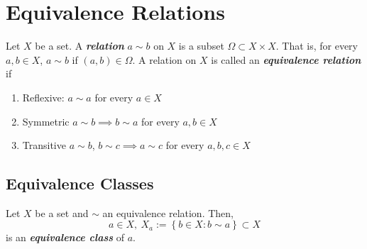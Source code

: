\documentclass{report}
\newcommand{\textib}[1]{\textit{\textbf{{#1}}}}
\begin{document}
\section{Equivalence Relations}
Let $X$ be a set. A \textib{relation} $a \sim b$ on $X$ is a subset $\Omega \subset X \times X$. That is,
for every $a, b \in X$, $a \sim b$ if $(a, b) \in \Omega$. A relation on $X$ is called an 
\textib{equivalence relation} if
\begin{enumerate}[label=\textit{(\roman*)}]
    \item Reflexive: $a \sim a$ for every $a \in X$
    \item Symmetric $a \sim b \implies b \sim a$ for every $a, b \in X$
    \item Transitive $a \sim b$, $b \sim c \implies a \sim c$ for every $a, b, c \in X$
\end{enumerate}


\subsection{Equivalence Classes}
Let $X$ be a set and $\sim$ an equivalence relation. Then,
\[a \in X, \ X_a := \left\{ b \in X : b \sim a \right\} \subset X\]
is an \textib{equivalence class} of $a$.
\end{document}
